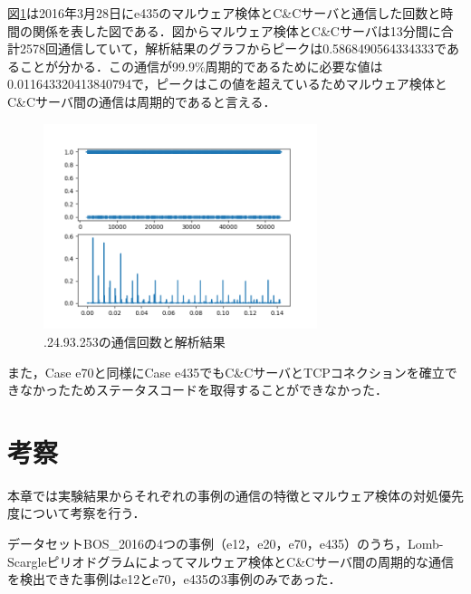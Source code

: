 \documentclass[twocolumn]{ltjsarticle}
\begin{document}
図\ref{fig:e435_result}は2016年3月28日にe435のマルウェア検体とC\&Cサーバと通信した回数と時間の関係を表した図である．図からマルウェア検体とC\&Cサーバは13分間に合計2578回通信していて，解析結果のグラフからピークは0.5868490564334333であることが分かる．この通信が99.9\%周期的であるために必要な値は0.011643320413840794で，ピークはこの値を超えているためマルウェア検体とC\&Cサーバ間の通信は周期的であると言える．
\begin{figure}[htbp]
  \centering
  \includegraphics[width=8cm]{images/20201214_修士論文予稿/e435_c2.png}
  \caption{\ast\ast\ast.24.93.253の通信回数と解析結果}
  \label{fig:e435_result}
\end{figure}

また，Case e70と同様にCase e435でもC\&CサーバとTCPコネクションを確立できなかったためステータスコードを取得することができなかった．

\section{考察}
本章では実験結果からそれぞれの事例の通信の特徴とマルウェア検体の対処優先度について考察を行う．

データセットBOS\_2016の4つの事例（e12，e20，e70，e435）のうち，Lomb-Scargleピリオドグラムによってマルウェア検体とC\&Cサーバ間の周期的な通信を検出できた事例はe12とe70，e435の3事例のみであった．
\end{document}
